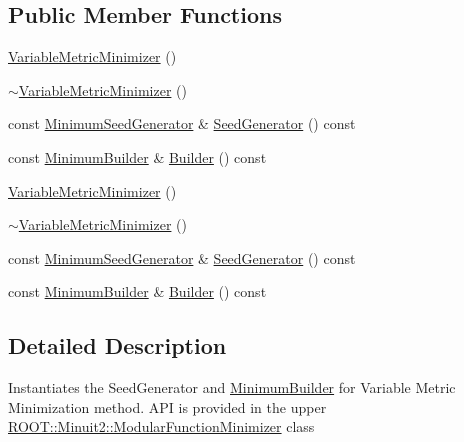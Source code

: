 \subsection*{Public Member Functions}
\begin{DoxyCompactItemize}
\item 
\mbox{\hyperlink{classROOT_1_1Minuit2_1_1VariableMetricMinimizer_a441dd894af1f9c01bd60d560260ee585}{Variable\+Metric\+Minimizer}} ()
\item 
\mbox{\hyperlink{classROOT_1_1Minuit2_1_1VariableMetricMinimizer_a2ccf4342c441f82eb4f57009ae69196e}{$\sim$\+Variable\+Metric\+Minimizer}} ()
\item 
const \mbox{\hyperlink{classROOT_1_1Minuit2_1_1MinimumSeedGenerator}{Minimum\+Seed\+Generator}} \& \mbox{\hyperlink{classROOT_1_1Minuit2_1_1VariableMetricMinimizer_a8ac2123142283dd05611842236caeadb}{Seed\+Generator}} () const
\item 
const \mbox{\hyperlink{classROOT_1_1Minuit2_1_1MinimumBuilder}{Minimum\+Builder}} \& \mbox{\hyperlink{classROOT_1_1Minuit2_1_1VariableMetricMinimizer_aa31a52e431960a91acf0b9c2997b397b}{Builder}} () const
\item 
\mbox{\hyperlink{classROOT_1_1Minuit2_1_1VariableMetricMinimizer_a441dd894af1f9c01bd60d560260ee585}{Variable\+Metric\+Minimizer}} ()
\item 
\mbox{\hyperlink{classROOT_1_1Minuit2_1_1VariableMetricMinimizer_a2ccf4342c441f82eb4f57009ae69196e}{$\sim$\+Variable\+Metric\+Minimizer}} ()
\item 
const \mbox{\hyperlink{classROOT_1_1Minuit2_1_1MinimumSeedGenerator}{Minimum\+Seed\+Generator}} \& \mbox{\hyperlink{classROOT_1_1Minuit2_1_1VariableMetricMinimizer_a8ac2123142283dd05611842236caeadb}{Seed\+Generator}} () const
\item 
const \mbox{\hyperlink{classROOT_1_1Minuit2_1_1MinimumBuilder}{Minimum\+Builder}} \& \mbox{\hyperlink{classROOT_1_1Minuit2_1_1VariableMetricMinimizer_aa31a52e431960a91acf0b9c2997b397b}{Builder}} () const
\end{DoxyCompactItemize}


\subsection{Detailed Description}
Instantiates the Seed\+Generator and \mbox{\hyperlink{classROOT_1_1Minuit2_1_1MinimumBuilder}{Minimum\+Builder}} for Variable Metric Minimization method. A\+PI is provided in the upper \mbox{\hyperlink{classROOT_1_1Minuit2_1_1ModularFunctionMinimizer}{R\+O\+O\+T\+::\+Minuit2\+::\+Modular\+Function\+Minimizer}} class 

